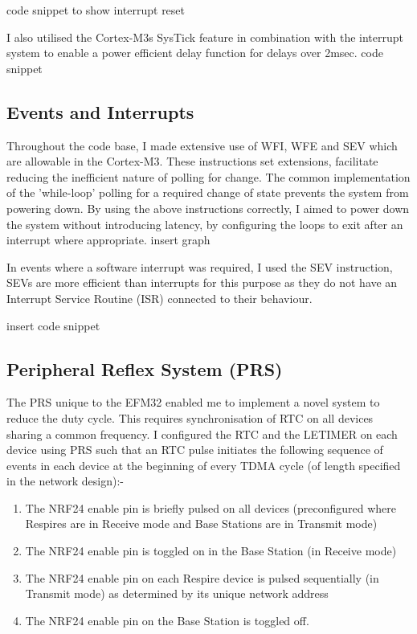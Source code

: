{code snippet to show interrupt reset}


I also utilised the Cortex-M3s SysTick feature in combination with the interrupt system to enable a
power efficient delay function for delays over 2msec.
{code snippet}


\subsection{Events and Interrupts}
Throughout the code base, I made extensive use of \acf{WFI}, \acf{WFE} and \acf{SEV}
which are allowable in the Cortex-M3. These instructions set extensions,
facilitate reducing the inefficient nature of polling for change. The common implementation of the
'while-loop' polling for a required change of state prevents the system from powering down. By
using the above instructions correctly, I aimed to power down the system without introducing
latency, by configuring the loops to exit after an interrupt where appropriate.
{insert graph}


In events where a software interrupt was required, I used the SEV instruction, SEVs are more
efficient than interrupts for this purpose as they do not have an Interrupt Service Routine (ISR)
connected to their behaviour.


{insert code snippet}


\subsection{Peripheral Reflex System (PRS)}
\label{sec:PRS}
The \ac{PRS} unique to the EFM32 enabled me to implement a novel system to reduce the duty cycle.
This requires synchronisation of \ac{RTC} on all devices sharing a common frequency. I
configured the \ac{RTC} and the \ac{LETIMER} on each device using \ac{PRS} such that an \ac{RTC}
pulse initiates the following sequence of events in each device at the beginning of every \ac{TDMA} cycle
(of length specified in the network design):-
\begin{enumerate}
  \item The NRF24 enable pin is briefly pulsed on all devices (preconfigured where Respires are in
        Receive mode and Base Stations are in Transmit mode)
  \item The NRF24 enable pin is toggled on in the Base Station (in Receive mode)
  \item The NRF24 enable pin on each Respire device is pulsed sequentially (in Transmit mode) as
        determined by its unique network address
  \item The NRF24 enable pin on the Base Station is toggled off.
\end{enumerate}


